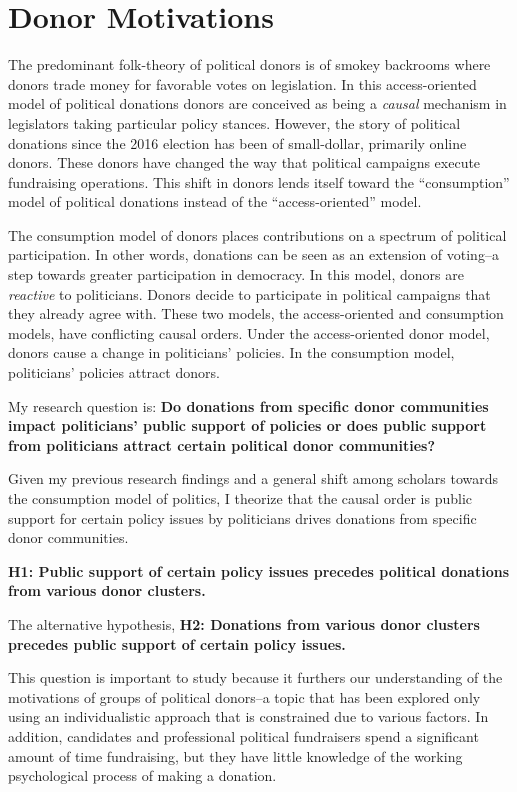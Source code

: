 \documentclass[12pt,]{article}
\begin{document}
\hypertarget{donor-motivations}{%
\section{Donor Motivations}\label{donor-motivations}}

The predominant folk-theory of political donors is of smokey backrooms
where donors trade money for favorable votes on legislation. In this
access-oriented model of political donations donors are conceived as
being a \emph{causal} mechanism in legislators taking particular policy
stances. However, the story of political donations since the 2016
election has been of small-dollar, primarily online donors. These donors
have changed the way that political campaigns execute fundraising
operations. This shift in donors lends itself toward the ``consumption''
model of political donations instead of the ``access-oriented'' model.

The consumption model of donors places contributions on a spectrum of
political participation. In other words, donations can be seen as an
extension of voting--a step towards greater participation in democracy.
In this model, donors are \emph{reactive} to politicians. Donors decide
to participate in political campaigns that they already agree with.
These two models, the access-oriented and consumption models, have
conflicting causal orders. Under the access-oriented donor model, donors
cause a change in politicians' policies. In the consumption model,
politicians' policies attract donors.

My research question is: \textbf{Do donations from specific donor
communities impact politicians' public support of policies or does
public support from politicians attract certain political donor
communities?}

Given my previous research findings and a general shift among scholars
towards the consumption model of politics, I theorize that the causal
order is public support for certain policy issues by politicians drives
donations from specific donor communities.

\textbf{H1: Public support of certain policy issues precedes political
donations from various donor clusters.}

The alternative hypothesis, \textbf{H2: Donations from various donor
clusters precedes public support of certain policy issues.}

This question is important to study because it furthers our
understanding of the motivations of groups of political donors--a topic
that has been explored only using an individualistic approach that is
constrained due to various factors. In addition, candidates and
professional political fundraisers spend a significant amount of time
fundraising, but they have little knowledge of the working psychological
process of making a donation.
\end{document}
